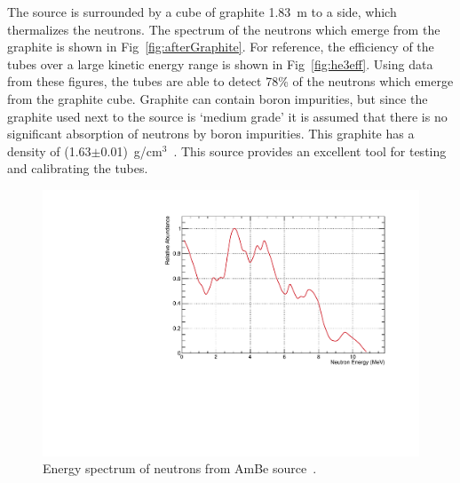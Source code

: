 The source is surrounded by a cube of graphite 1.83~m to a side, which thermalizes the neutrons. The spectrum of the neutrons which emerge from the graphite is shown in Fig~\ref{fig:afterGraphite}. For reference, the efficiency of the \he tubes over a large kinetic energy range is shown in Fig~\ref{fig:he3eff}. Using data from these figures, the \he tubes are able to detect 78\% of the neutrons which emerge from the graphite cube. Graphite can contain boron impurities, but since the graphite used next to the source is `medium grade' it is assumed that there is no significant absorption of neutrons by boron impurities. This graphite has a density of (1.63$\pm$0.01)~g/cm$^3$~\cite{AmBELetter}. This source provides an excellent tool for testing and calibrating the \he tubes. 

\begin{figure}
	\centerfloat
		\includegraphics[trim={0 0 0 0.75cm},clip, width=\textwidth]{images/AmBe_NeutronSpectrum.pdf}
	\caption[Energy spectrum of neutrons from AmBe source]{Energy spectrum of neutrons from AmBe source~\cite{AmBeSpec}.}
	\label{fig:AmBeSpec}
\end{figure}


